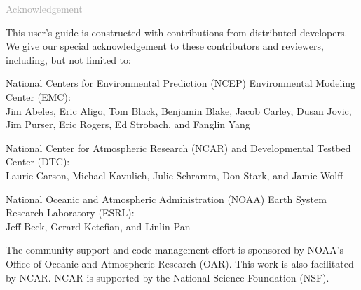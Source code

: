 \begin{titlepage}
\vspace*{0.5cm}
\noindent

\begin{flushleft}
\textcolor{darkgray}{\LARGE Acknowledgement}
\vspace*{1cm}\par

This user's guide is constructed with contributions from distributed developers. We give our special acknowledgement to these contributors and reviewers, including, but not limited to:

National Centers for Environmental Prediction (NCEP) Environmental Modeling Center (EMC): \\
Jim Abeles, Eric Aligo, Tom Black, Benjamin Blake, Jacob Carley, Dusan Jovic, Jim Purser, Eric Rogers, Ed Strobach, and Fanglin Yang

National Center for Atmospheric Research (NCAR) and Developmental Testbed Center (DTC): \\
Laurie Carson, Michael Kavulich, Julie Schramm, Don Stark, and Jamie Wolff  

National Oceanic and Atmospheric Administration (NOAA) Earth System Research Laboratory (ESRL): \\
Jeff Beck, Gerard Ketefian, and Linlin Pan

The community support and code management effort is sponsored by NOAA's Office of Oceanic and Atmospheric Research (OAR). This work is also facilitated by NCAR. NCAR is supported by the National Science Foundation (NSF).

\end{flushleft}
\end{titlepage}
\pagebreak{}
